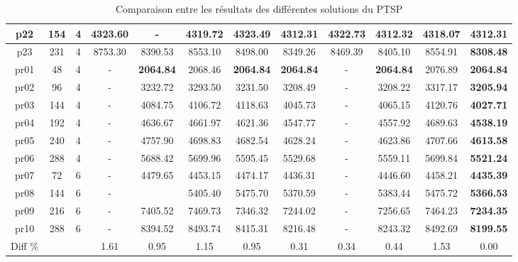 \begin{table}[h!]
\begin{tabular}{|c|c|c|c|c|c|c|c|c|c|c|c|}
    p22      & 154 & 4  & 4323.60 &     -    & 4319.72 & 4323.49 & \textbf{4312.31} & 4322.73 & 4312.32 & 4318.07 & \textbf{4312.31}  \\\hline
    p23      & 231 & 4  & 8753.30 & 8390.53 & 8553.10 & 8498.00 & 8349.26 & 8469.39 & 8405.10 & 8554.91 & \textbf{8308.48}  \\\hline
    pr01     & 48  & 4  &    -     & \textbf{2064.84} & 2068.46 & \textbf{2064.84} & \textbf{2064.84} &    -     & \textbf{2064.84} & 2076.89 & \textbf{2064.84}  \\\hline
    pr02     & 96  & 4  &    -     & 3232.72 & 3293.50 & 3231.50 & 3208.49 &    -     & 3208.22 & 3317.17 & \textbf{3205.94}  \\\hline
    pr03     & 144 & 4  &    -     & 4084.75 & 4106.72 & 4118.63 & 4045.73 &    -     & 4065.15 & 4120.76 & \textbf{4027.71}  \\\hline
    pr04     & 192 & 4  &    -     & 4636.67 & 4661.97 & 4621.36 & 4547.77 &    -     & 4557.92 & 4689.63 & \textbf{4538.19}  \\\hline
    pr05     & 240 & 4  &    -     & 4757.90 & 4698.83 & 4682.54 & 4628.24 &    -     & 4623.86 & 4707.66 & \textbf{4613.58}  \\\hline
    pr06     & 288 & 4  &    -     & 5688.42 & 5699.96 & 5595.45 & 5529.68 &    -     & 5559.11 & 5699.84 & \textbf{5521.24}  \\\hline
    pr07     & 72  & 6  &    -     & 4479.65 & 4453.15 & 4474.17 & 4436.31 &    -     & 4446.60 & 4458.21 & \textbf{4435.39}  \\\hline
    pr08     & 144 & 6  &    -     &         & 5405.40 & 5475.70 & 5370.59 &    -     & 5383.44 & 5475.72 & \textbf{5366.53}  \\\hline
    pr09     & 216 & 6  &    -     & 7405.52 & 7469.73 & 7346.32 & 7244.02 &    -     & 7256.65 & 7464.23 & \textbf{7234.35}  \\\hline
    pr10     & 288 & 6  &   -      & 8394.52 & 8493.74 & 8415.31 & 8216.48 &    -     & 8243.32 & 8492.69 & \textbf{8199.55}  \\\hline
    Diff \%   &        &       & 1.61    & 0.95    & 1.15    & 0.95    & 0.31    & 0.34    & 0.44    & 1.53    & 0.00   \\\hline 
    \end{tabular}
    \caption{Comparaison entre les résultats des différentes solutions du PTSP}
    \label{tab:ptsp-results-comparison}
\end{table}
\FloatBarrier



